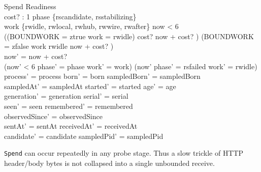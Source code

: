 \documentclass[a4paper,10pt,fleqn]{article}
\begin{document}
\begin{schema}{Spend}
  \Delta Readiness \\
  cost? : 1 
\where
  phase \in \{rscandidate, rsstabilizing\} \\
  work \in \{rwidle, rwlocal, rwhub, rwwire, rwafter\} \land now < 6 \\
  ((BOUNDWORK = ztrue \lor work = rwidle) \land cost?  \land now + cost? )
    \lor (BOUNDWORK = zfalse \land work \neq rwidle \land now + cost? ) \\
  now' = now + cost? \\
  (now' < 6 \land phase' = phase \land work' = work) \lor
    (now'  \land phase' = rsfailed \land work' = rwidle) \\
  process' = process \land born' = born \land sampledBorn' = sampledBorn \\
  sampledAt' = sampledAt \land started' = started \land age' = age \\
  generation' = generation \land serial' = serial \\
  seen' = seen \land remembered' = remembered \\
  observedSince' = observedSince \\
  sentAt' = sentAt \land receivedAt' = receivedAt \\
  candidate' = candidate \land sampledPid' = sampledPid
\end{schema}
\texttt{Spend} can occur repeatedly in any probe stage. Thus a slow trickle of
HTTP header/body bytes is not collapsed into a single unbounded receive.
\end{document}
